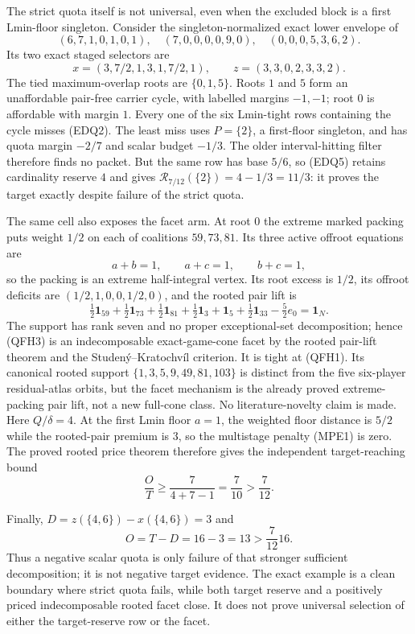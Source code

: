 \documentclass[11pt]{article}
\begin{document}
The strict quota itself is not universal, even when the excluded block is a first
Lmin-floor singleton.  Consider the singleton-normalized exact lower envelope
of
\[
 (6,7,1,0,1,0,1),\quad(7,0,0,0,0,9,0),\quad
 (0,0,0,5,3,6,2).                                  \tag{QFH1}
\]
Its two exact staged selectors are
\[
 x=(3,7/2,1,3,1,7/2,1),\qquad
 z=(3,3,0,2,3,3,2).                                \tag{QFH2}
\]
The tied maximum-overlap roots are $\{0,1,5\}$.  Roots $1$ and $5$ form an
unaffordable pair-free carrier cycle, with labelled margins $-1,-1$; root
$0$ is affordable with margin $1$.  Every one of the six Lmin-tight rows
containing the cycle misses (EDQ2).  The least miss uses $P=\{2\}$, a
first-floor singleton, and has quota margin $-2/7$ and scalar budget
$-1/3$.  The older interval-hitting filter therefore finds no packet.  But
the same row has base $5/6$, so (EDQ5) retains cardinality reserve $4$ and
gives $\mathcal R_{7/12}(\{2\})=4-1/3=11/3$: it proves the target exactly
despite failure of the strict quota.

The same cell also exposes the facet arm.  At root $0$ the
extreme marked packing puts weight $1/2$ on each of coalitions $59,73,81$.
Its three active offroot equations are
\[
 a+b=1,\qquad a+c=1,\qquad b+c=1,
\]
so the packing is an extreme half-integral vertex.  Its root excess is
$1/2$, its offroot deficits are $(1/2,1,0,0,1/2,0)$, and the rooted pair
lift is
\[
 \tfrac12\mathbf1_{59}+\tfrac12\mathbf1_{73}
 +\tfrac12\mathbf1_{81}+\tfrac12\mathbf1_3
 +\mathbf1_5+\tfrac12\mathbf1_{33}
 -\tfrac52 e_0=\mathbf1_N.                         \tag{QFH3}
\]
The support has rank seven and no proper exceptional-set decomposition;
hence (QFH3) is an indecomposable exact-game-cone facet by the rooted
pair-lift theorem and the Studen\'y--Kratochv\'il criterion.  It is tight at
(QFH1).  Its canonical rooted support
$\{1,3,5,9,49,81,103\}$ is distinct from the five six-player residual-atlas
orbits, but the facet mechanism is the already proved extreme-packing pair
lift, not a new full-cone class.  No literature-novelty claim is made.
Here $Q/\delta=4$.  At the first Lmin floor $a=1$, the weighted floor
distance is $5/2$ while the rooted-pair premium is $3$, so the multistage
penalty (MPE1) is zero.  The proved rooted price theorem therefore gives the
independent target-reaching bound
\[
 \frac OT\ge \frac{7}{4+7-1}=\frac7{10}>\frac7{12}.                 \tag{QFH3a}
\]

Finally, $D=z(\{4,6\})-x(\{4,6\})=3$ and
\[
 O=T-D=16-3=13>\frac7{12}16.                       \tag{QFH4}
\]
Thus a negative scalar quota is only failure of that stronger sufficient
decomposition; it is not negative target evidence.  The exact example is a
clean boundary where strict quota fails, while both target reserve and a
positively priced indecomposable rooted facet close.  It does not prove
universal selection of either the target-reserve row or the facet.
\end{document}

